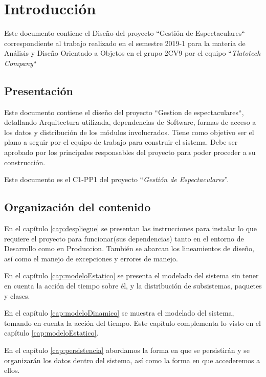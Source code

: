 \chapter{Introducción}

    Este documento contiene el Diseño del proyecto ``Gestión de Espectaculares`` correspondiente al trabajo realizado en el semestre 2019-1 para la materia de Análisis y Diseño Orientado a Objetos en el grupo 2CV9 por el equipo ``{\em Tlatotech Company}``

\section{Presentación}

    Este documento contiene el diseño del proyecto ``Gestion de espectaculares``, detallando Arquitectura utilizada, dependencias de Software, formas de acceso a los datos y distribución de los módulos involucrados. Tiene como objetivo ser el plano a seguir por el equipo de trabajo para construir el sistema. Debe ser aprobado por los principales responsables del proyecto para poder proceder a su construcción.
	
	Este documento es el C1-PP1 del proyecto ``{\em Gestión de Espectaculares}''.
	
\section{Organización del contenido}

	En el capítulo \ref{cap:despliegue} se presentan las instrucciones para instalar lo que requiere el proyecto para funcionar(sus dependencias) tanto en el entorno de Desarrollo como en Produccion. También se abarcan los lineamientos de diseño, así como el manejo de excepciones y errores de manejo.
	
	En el capítulo \ref{cap:modeloEstatico} se presenta el modelado del sistema sin tener en cuenta la acción del tiempo sobre él, y la distribución de subsistemas, paquetes y clases.
	
	En el capítulo \ref{cap:modeloDinamico} se muestra el modelado del sistema, tomando en cuenta la acción del tiempo. Este capítulo complementa lo visto en el capítulo \ref{cap:modeloEstatico}.
	
	En el capítulo \ref{cap:persistencia} abordamos la forma en que se persistirán y se organizarán los datos dentro del sistema, así como la forma en que accederemos a ellos.



